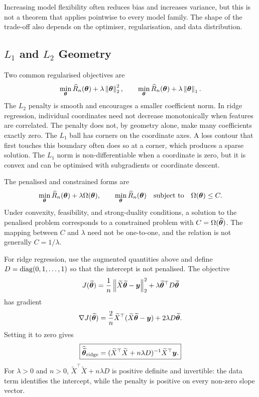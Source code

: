 Increasing model flexibility often reduces bias and increases variance, but this is not a theorem that applies pointwise to every model family. The shape of the trade-off also depends on the optimiser, regularisation, and data distribution.

\BiasVarianceFigure

\subsection{\texorpdfstring{$L_1$ and $L_2$ Geometry}{L1 and L2 Geometry}}

Two common regularised objectives are
\[
  \min_{\bm{\theta}}
    \widehat R_n(\bm{\theta})+\lambda\left\lVert \bm{\theta}\right\rVert_2^2,
  \qquad
  \min_{\bm{\theta}}
    \widehat R_n(\bm{\theta})+\lambda\left\lVert \bm{\theta}\right\rVert_1.
\]
The $L_2$ penalty is smooth and encourages a smaller coefficient norm. In ridge regression, individual coordinates need not decrease monotonically when features are correlated. The penalty does not, by geometry alone, make many coefficients exactly zero. The $L_1$ ball has corners on the coordinate axes. A loss contour that first touches this boundary often does so at a corner, which produces a sparse solution. The $L_1$ norm is non-differentiable when a coordinate is zero, but it is convex and can be optimised with subgradients or coordinate descent.

\RegularisationGeometryFigure

The penalised and constrained forms are
\[
  \min_{\bm{\theta}}
    \widehat R_n(\bm{\theta})+\lambda\Omega(\bm{\theta}),
  \qquad
  \min_{\bm{\theta}}\widehat R_n(\bm{\theta})
  \quad\text{subject to}\quad
  \Omega(\bm{\theta})\leq C.
\]
Under convexity, feasibility, and strong-duality conditions, a solution to the penalised problem corresponds to a constrained problem with
$C=\Omega(\widehat{\bm{\theta}})$. The mapping between $C$ and $\lambda$ need not be one-to-one, and the relation is not generally $C=1/\lambda$.

For ridge regression, use the augmented quantities above and define
$D=\operatorname{diag}(0,1,\ldots,1)$ so that the intercept is not penalised. The objective
\[
  J(\widetilde{\bm{\theta}})
  =\frac1n\left\lVert \widetilde X\widetilde{\bm{\theta}}-\bm{y}\right\rVert_2^2
   +\lambda\widetilde{\bm{\theta}}^{\top}D\widetilde{\bm{\theta}}
\]
has gradient
\[
  \nabla J(\widetilde{\bm{\theta}})
  =\frac2n\widetilde X^{\top}
    (\widetilde X\widetilde{\bm{\theta}}-\bm{y})
   +2\lambda D\widetilde{\bm{\theta}}.
\]
Setting it to zero gives
\[
  \boxed{
  \widehat{\widetilde{\bm{\theta}}}_{\mathrm{ridge}}
  =(\widetilde X^{\top}\widetilde X+n\lambda D)^{-1}
    \widetilde X^{\top}\bm{y}.}
\]
For $\lambda>0$ and $n>0$, $\widetilde X^{\top}\widetilde X+n\lambda D$ is positive definite and invertible: the data term identifies the intercept, while the penalty is positive on every non-zero slope vector.

